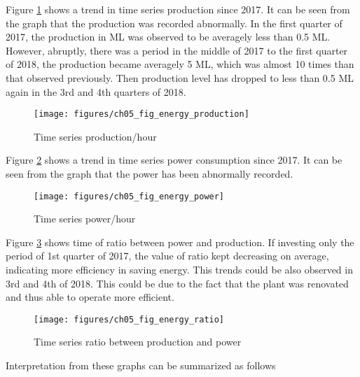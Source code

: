 Figure \ref{ch05_fig_energy_production} shows a trend in time series production since 2017. It can be seen from the graph that the production was recorded abnormally. In the first quarter of 2017, the production in ML was observed to be averagely less than 0.5 ML. However, abruptly, there was a period in the middle of 2017 to the first quarter of 2018, the production became averagely 5 ML, which was almost 10 times than that observed previously. Then production level has dropped to less than 0.5 ML again in the 3rd and 4th quarters of 2018. 

\begin{figure}[!htb]
	\texttt{[image: figures/ch05\_fig\_energy\_production]} \\
	\caption{Time series production/hour}
	\label{ch05_fig_energy_production} 
\end{figure}

Figure \ref{ch05_fig_energy_power} shows a trend in time series power consumption since 2017. It can be seen from the graph that the power has been abnormally recorded. 

\begin{figure}[!htb]
	\texttt{[image: figures/ch05\_fig\_energy\_power]} \\
	\caption{Time series power/hour}
	\label{ch05_fig_energy_power} 
\end{figure}
Figure \ref{ch05_fig_energy_ratio} shows time  of ratio between power and production. If investing only the period of 1st quarter of 2017, the value of ratio kept decreasing on average, indicating more efficiency in saving energy. This trends could be also observed in 3rd and 4th of 2018. This could be due to the fact that the plant was renovated and thus able to operate more efficient.


\begin{figure}[!htb]
	
	\texttt{[image: figures/ch05\_fig\_energy\_ratio]} \\
	\caption{Time series ratio between production and power}
	\label{ch05_fig_energy_ratio} 
\end{figure}

Interpretation from these graphs can be summarized as follows

